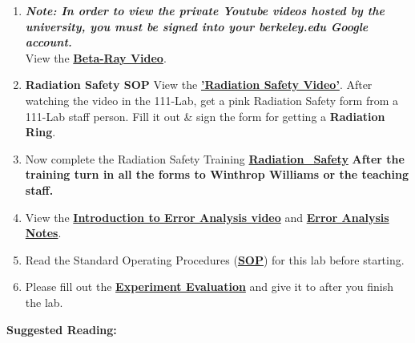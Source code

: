\documentclass{../lab}
\begin{document}
\begin{enumerate}
    \item \emph{\textbf{Note: In order to view the private Youtube videos hosted by the university, you must be signed into your berkeley.edu Google account.}} \\
    View the \href{http://youtu.be/qJ4MPtMmFPw}{\textbf{Beta-Ray Video}}.

    \item \textbf{Radiation Safety SOP} View the \href{http://youtu.be/KHxtzF5pZZM}{\textbf{'Radiation Safety Video'}}. After watching the video in the 111-Lab, get a pink Radiation Safety form from a 111-Lab staff person. Fill it out \& sign the form for getting a \textbf{Radiation Ring}.

    \item Now complete the Radiation Safety Training \href{http://experimentationlab.berkeley.edu/RadiationSafety}{\textbf{Radiation\_Safety}} \textbf{After the training turn in all the forms to Winthrop Williams or the teaching staff.}

    \item View the \href{\ErrorAnalysisVideo}{\textbf{Introduction to Error Analysis video}} and \href{\ErrorAnalysisNotes}{\textbf{\textbf{Error Analysis Notes}}}.

    \item Read the Standard Operating Procedures (\href{http://experimentationlab.berkeley.edu/sites/default/files/images/SOP\_3271\_Cs-137\_Na-22\_Co-60\_Mn-54\_Am-241\_Fe-55\_2014.pdf}{\textbf{SOP}}) for this lab before starting.

    \item Please fill out the \href{\ExperimentEvaluation}{\textbf{Experiment Evaluation}} and give it to \LabEngineer after you finish the lab.

\end{enumerate}

\textbf{Suggested Reading:}
\end{document}
